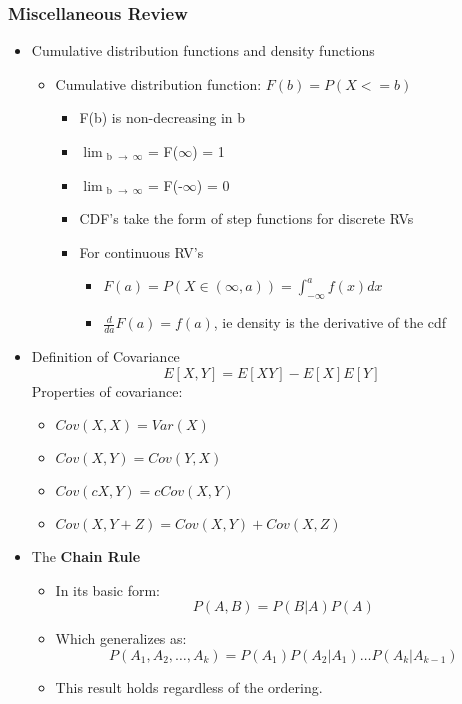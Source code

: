\documentclass[10pt,containsverbatim,paralist]{article}
\begin{document}
\subsubsection*{Miscellaneous Review}
\label{sec-1-1-9}
\begin{itemize}
\item Cumulative distribution functions and density functions
\label{sec-1-1-9-1}
\begin{itemize}
\item Cumulative distribution function: $F(b) = P(X<=b)$
\label{sec-1-1-9-1-1}
\begin{itemize}
\item F(b) is non-decreasing in b
\item $\lim$$_{\text{b }\to\ \infty}$ = F($\infty$) = 1
\item $\lim$$_{\text{b }\to\ \infty}$ = F(-$\infty$) = 0
\item CDF's take the form of step functions for discrete RVs
\item For continuous RV's
\begin{itemize}
\item $F(a)= P(X \in (\infty,a)) = \int_{-\infty}^a f(x) dx$
\item $\frac{d}{da} F(a) = f(a)$, ie density is the derivative of the cdf
\end{itemize}
\end{itemize}
\end{itemize}
\item Definition of Covariance
\label{sec-1-1-9-2}
$$E[X,Y]=E[XY]-E[X]E[Y]$$
Properties of covariance:
\begin{itemize}
\item $Cov(X,X)=Var(X)$
\item $Cov(X,Y)=Cov(Y,X)$
\item $Cov(cX,Y)=cCov(X,Y)$
\item $Cov(X,Y+Z)= Cov(X,Y)+Cov(X,Z)$
\end{itemize}
\item The \textbf{Chain Rule}
\label{sec-1-1-9-3}
\begin{itemize}
\item In its basic form:
\label{sec-1-1-9-3-1}
$$P(A,B) = P(B|A)P(A)$$
\item Which generalizes as:
\label{sec-1-1-9-3-2}
$$P(A_1,A_2,\ldots,A_k)=P(A_1)P(A_2|A_1)\ldots P(A_k|A_{k-1})$$
\item This result holds regardless of the ordering.
\label{sec-1-1-9-3-3}
\end{itemize}
\end{itemize}
\end{document}
